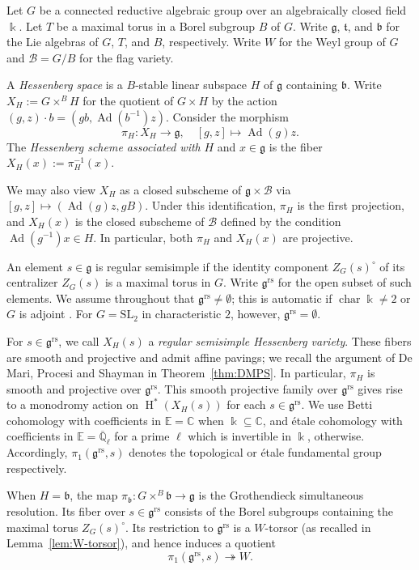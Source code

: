 \documentclass[11pt]{amsart}
\numberwithin{equation}{section}
\theoremstyle{definition}
\newcommand\grs{\mathfrak{g}^{\mathrm{rs}}}
\def\lra{\longrightarrow }
\def\beq{\begin{equation}}
\def\eeq{\end{equation}}
\DeclareMathOperator{\car}{\mathrm{char}}
\DeclareMathOperator{\Ad}{\mathrm{Ad}}
\DeclareMathOperator{\coh}{\mathrm{H}}
\def\cB{\mathcal {B}}
\def\C{\mathbb{C}}
\def\EE{\mathbb{E}}
\def\fg{\mathfrak {g}}
\def\fb{\mathfrak {b}}
\def\ft{\mathfrak {t}}
\begin{document}
Let $G$ be a connected reductive algebraic group over an algebraically closed field $\Bbbk$. 
Let $T$ be a maximal torus in a Borel subgroup $B$ of $G$. 
Write $\fg$, $\ft$, and $\fb$ for the Lie algebras of $G$, $T$, and $B$, respectively.
Write $W$ for the Weyl group of $G$ and $\cB=G/B$ for the flag variety. 

A \emph{Hessenberg space} is a $B$-stable linear subspace $H$ of $\fg$ containing $\fb$. 
Write $X_H:=G\times^B H$ for the quotient of $G\times H$ by the action
$(g,z)\cdot b=(gb,\Ad(b^{-1})z)$. 
Consider the morphism
\beq\label{e:mainmor}
\pi_H:X_H\lra\fg, \quad[g,z]\mapsto\Ad(g)z.
\eeq
The \emph{Hessenberg scheme associated with} $H$ and $x\in\fg$ is the fiber $X_H(x):=\pi_H^{-1}(x)$. 

We may also view $X_H$ as a closed subscheme of $\fg\times\cB$ via $[g,z]\mapsto(\Ad(g)z,gB)$.
Under this identification, $\pi_H$ is the first projection, and $X_H(x)$ is the closed subscheme of $\cB$ defined by the condition $\Ad(g^{-1})x\in H$.
In particular, both $\pi_H$ and $X_H(x)$ are projective.

An element $s\in\fg$ is regular semisimple if the identity component $Z_G(s)^\circ$ of its centralizer $Z_G(s)$ is a maximal torus in $G$. 
Write $\grs$ for the open subset of such elements. We assume throughout that $\grs\neq\emptyset$; this is automatic if $\car \Bbbk\ne2$ or $G$ is adjoint
\cite[Section~13.3]{jantzen-nilpotent}.
For $G=\mathrm{SL}_2$ in characteristic $2$, however, $\grs=\emptyset$.

For $s\in\grs$, we call $X_H(s)$ a \emph{regular semisimple Hessenberg variety}. 
These fibers are smooth and projective and admit affine pavings; we recall the argument of De Mari, Procesi and Shayman \cite{demari-procesi-shayman} in Theorem~\ref{thm:DMPS}.
In particular, $\pi_H$ is smooth and projective over $\grs$.
This smooth projective family over $\grs$ gives rise to a monodromy action on $\coh^*(X_H(s))$ for each $s\in \grs$.
We use Betti cohomology with coefficients in $\EE=\C$ when
$\Bbbk\subseteq\C$, and \'etale cohomology with coefficients in
$\EE=\overline{\mathbb Q}_\ell$ for a prime $\ell$ which is invertible in $\Bbbk$, otherwise. Accordingly,
$\pi_1(\grs,s)$ denotes the topological or \'etale fundamental group respectively.

When $H=\fb$, the map $\pi_\fb:G\times^B\fb\to\fg$ is the Grothendieck simultaneous resolution.
Its fiber over $s\in\grs$ consists of the Borel subgroups containing the maximal torus $Z_G(s)^\circ$.
Its restriction to $\grs$ is a $W$-torsor (as recalled in Lemma~\ref{lem:W-torsor}), and hence induces a quotient
\[
 \pi_1(\grs,s)\twoheadrightarrow W.
\]
\end{document}
